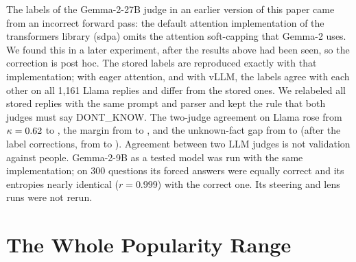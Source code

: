 \documentclass[11pt]{article}
\begin{document}
The labels of the Gemma-2-27B judge in an earlier version of this paper came from an incorrect forward pass: the default attention implementation of the transformers library (sdpa) omits the attention soft-capping that Gemma-2 uses. We found this in a later experiment, after the results above had been seen, so the correction is post hoc. The stored labels are reproduced exactly with that implementation; with eager attention, and with vLLM, the labels agree with each other on all 1{,}161 Llama replies and differ from the stored ones. We relabeled all \cRejudged{} stored replies with the same prompt and parser and kept the rule that both judges must say DONT\_KNOW. The two-judge agreement on Llama rose from $\kappa=0.62$ to \hmLlamaKappa{}, the margin from \asPrintedMargin{} \asPrintedMarginCI{} to \hmLlamaDiff{} \hmLlamaDiffCI, and the unknown-fact gap from \asPrintedUnk{} \asPrintedUnkCI{} to \rcUnk{} \rcUnkCI{} (after the label corrections, from \asPrintedUnkJoint{} \asPrintedUnkJointCI{} to \rcUnkJoint{} \rcUnkJointCI). Agreement between two LLM judges is not validation against people. Gemma-2-9B as a tested model was run with the same implementation; on 300 questions its forced answers were equally correct and its entropies nearly identical ($r=0.999$) with the correct one. Its steering and lens runs were not rerun.

\section{The Whole Popularity Range}
\label{app:range}
\end{document}
